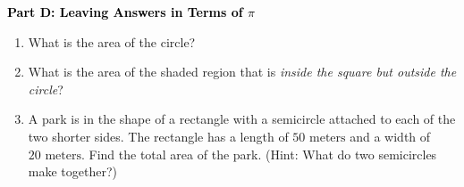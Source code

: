 \documentclass[12pt, letterpaper, fleqn]{article}
\newcommand{\blank}{\underline{\hspace{2.2cm}}}
\begin{document}
\newpage

\begin{tcolorbox}[colback=customteal!20]
\large\textcolor{black}{\textbf{Part D: Leaving Answers in Terms of $\pi$}}
\end{tcolorbox}

\vspace{3mm}

\begin{enumerate}[itemsep=5.5cm, leftmargin=0.6cm, resume]
\item What is the area of the circle? \blank
\item What is the area of the shaded region that is \textit{inside the square but outside the circle}? \blank
\item A park is in the shape of a rectangle with a semicircle attached to each of the two shorter sides. The rectangle has a length of $50\text{ meters}$ and a width of $20\text{ meters}$. Find the total area of the park. (Hint: What do two semicircles make together?)
\end{enumerate}
\end{document}
